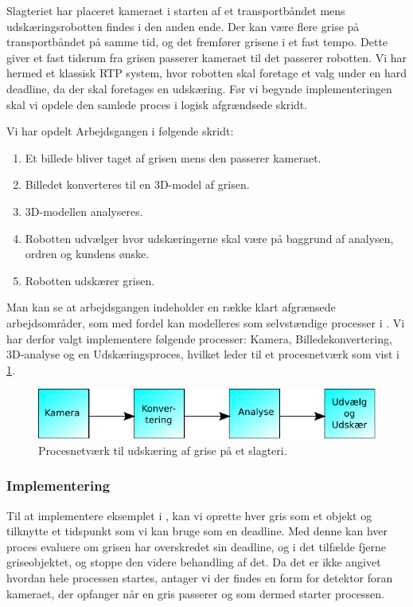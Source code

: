 Slagteriet har placeret kameraet i starten af et transportbåndet mens udskæringsrobotten findes i den anden ende. Der kan være flere grise på transportbåndet på samme tid, og det fremfører grisene i et fast tempo. Dette giver et fast tidsrum fra grisen passerer kameraet til det passerer robotten. Vi har hermed et klassisk RTP system, hvor robotten skal foretage et valg under en hard deadline, da der skal foretages en udskæring. Før vi begynde implementeringen skal vi opdele den samlede proces i logisk afgrændsede skridt.

Vi har opdelt Arbejdsgangen i følgende skridt: 
\begin{enumerate}
\tightlist
	\item Et billede bliver taget af grisen mens den passerer kameraet.
	\item Billedet konverteres til en 3D-model af grisen.
	\item 3D-modellen analyseres.
	\item Robotten udvælger hvor udskæringerne skal være på baggrund af analysen, ordren og kundens ønske.
	\item Robotten udskærer grisen.
\end{enumerate}

Man kan se at arbejdsgangen indeholder en  række klart afgrænsede arbejdsområder, som med fordel kan modelleres som selvstændige processer i \pycsp.  Vi har derfor valgt implementere følgende processer: Kamera, Billedekonvertering, 3D-analyse og en Udskæringsproces, hvilket leder til et procesnetværk som vist i \cref{fig:pig-network}.

\begin{figure}
 \begin{center}
  \includegraphics[scale=1]{images/pig-network}
	\caption{Procesnetværk til udskæring af grise på et slagteri.}
	\label{fig:pig-network}
\end{center}
\end{figure}

\subsubsection*{Implementering}\label{sec:deadline-exampel-implementation}
Til at implementere eksemplet i \pycsp, kan vi oprette hver gris som et objekt og tilknytte et tidspunkt som vi kan bruge som en deadline. Med denne kan hver proces evaluere om grisen har overskredet sin deadline, og i det tilfælde fjerne griseobjektet, og stoppe den videre behandling af det. Da det er ikke angivet hvordan hele processen startes,  antager vi der findes en form for detektor foran kameraet, der opfanger når en gris passerer og som dermed starter processen. 

